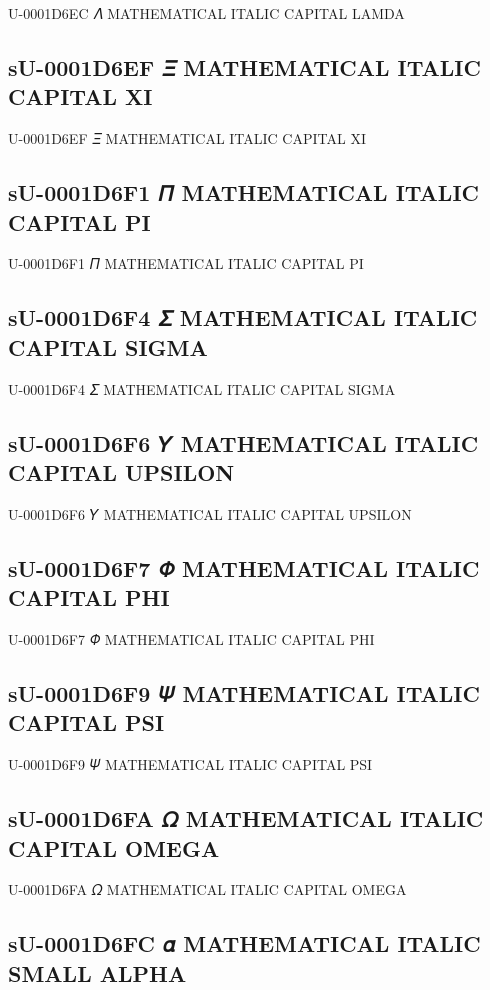 U-0001D6EC 𝛬 MATHEMATICAL ITALIC CAPITAL LAMDA

\subsection{sU-0001D6EF 𝛯 MATHEMATICAL ITALIC CAPITAL XI}

U-0001D6EF 𝛯 MATHEMATICAL ITALIC CAPITAL XI

\subsection{sU-0001D6F1 𝛱 MATHEMATICAL ITALIC CAPITAL PI}

U-0001D6F1 𝛱 MATHEMATICAL ITALIC CAPITAL PI

\subsection{sU-0001D6F4 𝛴 MATHEMATICAL ITALIC CAPITAL SIGMA}

U-0001D6F4 𝛴 MATHEMATICAL ITALIC CAPITAL SIGMA

\subsection{sU-0001D6F6 𝛶 MATHEMATICAL ITALIC CAPITAL UPSILON}

U-0001D6F6 𝛶 MATHEMATICAL ITALIC CAPITAL UPSILON

\subsection{sU-0001D6F7 𝛷 MATHEMATICAL ITALIC CAPITAL PHI}

U-0001D6F7 𝛷 MATHEMATICAL ITALIC CAPITAL PHI

\subsection{sU-0001D6F9 𝛹 MATHEMATICAL ITALIC CAPITAL PSI}

U-0001D6F9 𝛹 MATHEMATICAL ITALIC CAPITAL PSI

\subsection{sU-0001D6FA 𝛺 MATHEMATICAL ITALIC CAPITAL OMEGA}

U-0001D6FA 𝛺 MATHEMATICAL ITALIC CAPITAL OMEGA

\subsection{sU-0001D6FC 𝛼 MATHEMATICAL ITALIC SMALL ALPHA}

